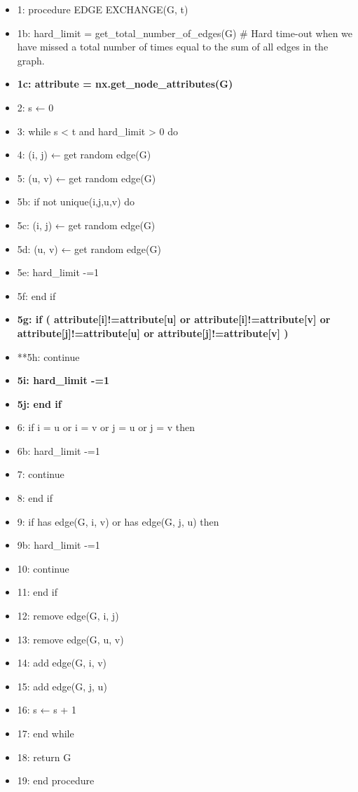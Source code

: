 \documentclass[11pt]{article}
\begin{document}
    \begin{itemize}
\item
  1: procedure EDGE EXCHANGE(G, t)
\item
  1b: hard\_limit = get\_total\_number\_of\_edges(G) \# Hard time-out
  when we have missed a total number of times equal to the sum of all
  edges in the graph.
\item
  \textbf{1c: attribute = nx.get\_node\_attributes(G)}
\item
  2: s ← 0
\item
  3: while s \textless{} t and hard\_limit \textgreater{} 0 do
\item
  4: (i, j) ← get random edge(G)
\item
  5: (u, v) ← get random edge(G)
\item
  5b: if not unique(i,j,u,v) do
\item
  5c: (i, j) ← get random edge(G)
\item
  5d: (u, v) ← get random edge(G)
\item
  5e: hard\_limit -=1
\item
  5f: end if
\item
  \textbf{5g: if ( attribute{[}i{]}!=attribute{[}u{]} or
  attribute{[}i{]}!=attribute{[}v{]} or}
  \textbf{attribute{[}j{]}!=attribute{[}u{]} or
  attribute{[}j{]}!=attribute{[}v{]} )}
\item
  **5h: continue
\item
  \textbf{5i: hard\_limit -=1}
\item
  \textbf{5j: end if}\\
\item
  6: if i = u or i = v or j = u or j = v then
\item
  6b: hard\_limit -=1
\item
  7: continue
\item
  8: end if
\item
  9: if has edge(G, i, v) or has edge(G, j, u) then
\item
  9b: hard\_limit -=1
\item
  10: continue
\item
  11: end if
\item
  12: remove edge(G, i, j)
\item
  13: remove edge(G, u, v)
\item
  14: add edge(G, i, v)
\item
  15: add edge(G, j, u)
\item
  16: s ← s + 1
\item
  17: end while
\item
  18: return G
\item
  19: end procedure
\end{itemize}
\end{document}
